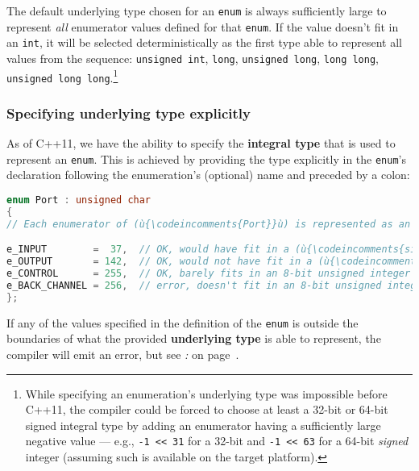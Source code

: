 \noindent The default underlying type chosen for an \texttt{enum} is always
sufficiently large to represent \emph{all} enumerator values defined for
that \texttt{enum}. If the value doesn't fit in an \texttt{int}, it will
be selected deterministically as the first type able to represent all
values from the sequence: \texttt{unsigned}~\texttt{int}, \texttt{long},
\texttt{unsigned}~\texttt{long}, \texttt{long}~\texttt{long},
\texttt{unsigned}~\texttt{long}~\texttt{long}.{\cprotect\footnote{While
specifying an enumeration's underlying type was impossible before
C++11, the compiler could be forced to choose at least a 32-bit or
64-bit signed integral type by adding an enumerator having a
sufficiently large negative value --- e.g.,
\texttt{-1}~\texttt{<<}~\texttt{31} for a 32-bit and
\texttt{-1}~\texttt{<<}~\texttt{63} for a 64-bit \emph{signed} integer
(assuming such is available on the target platform).}}

\subsubsection[Specifying underlying type explicitly]{Specifying underlying type explicitly}\label{specifying-underlying-type-explicitly}

As of C++11, we have the ability to specify the \textbf{integral type}
that is used to represent an \texttt{enum}. This is achieved by
providing the type explicitly in the \texttt{enum}'s declaration
following the enumeration's (optional) name and preceded by a colon:

\begin{lstlisting}[language=C++]
enum Port : unsigned char
{
// Each enumerator of (ù{\codeincomments{Port}}ù) is represented as an (ù{\codeincomments{unsigned char}}ù) type.

e_INPUT        =  37,  // OK, would have fit in a (ù{\codeincomments{signed char}}ù) too
e_OUTPUT       = 142,  // OK, would not have fit in a (ù{\codeincomments{signed char}}ù)
e_CONTROL      = 255,  // OK, barely fits in an 8-bit unsigned integer
e_BACK_CHANNEL = 256,  // error, doesn't fit in an 8-bit unsigned integer
};
\end{lstlisting}

\noindent If any of the values specified in the definition of the \texttt{enum} is
outside the boundaries of what the provided \textbf{underlying type} is
able to represent, the compiler will emit an error, but see \textit{: } on page~\pageref{subtleties-of-integral-promotion}.

